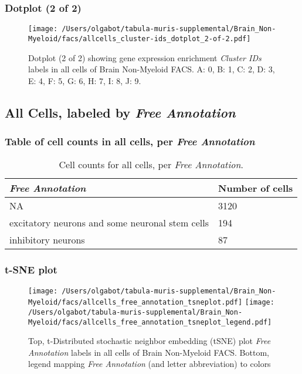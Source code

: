 \clearpage

\subsubsection{Dotplot (2 of 2)}
\begin{figure}[h]
\centering
\texttt{[image: /Users/olgabot/tabula-muris-supplemental/Brain\_Non-Myeloid/facs/allcells\_cluster-ids\_dotplot\_2-of-2.pdf]}

\caption{ Dotplot (2 of 2)  showing gene expression enrichment \emph{Cluster IDs} labels in all cells of Brain Non-Myeloid FACS. A: 0, B: 1, C: 2, D: 3, E: 4, F: 5, G: 6, H: 7, I: 8, J: 9.}
\end{figure}


\clearpage

\subsection{All Cells, labeled by \emph{Free Annotation}}
\subsubsection{Table of cell counts in all cells, per \emph{Free Annotation}}\begin{table}[h]
\centering
\label{my-label}
\begin{tabular}{@{}ll@{}}
\toprule

\emph{Free Annotation}& Number of cells \\ \midrule
NA & 3120 \\

excitatory neurons and some neuronal stem cells & 194 \\

inhibitory neurons & 87 \\
\bottomrule
\end{tabular}
\caption{Cell counts for all cells, per \emph{Free Annotation}.}
\end{table}

\clearpage
\subsubsection{t-SNE plot}
\begin{figure}[h]
\centering
\texttt{[image: /Users/olgabot/tabula-muris-supplemental/Brain\_Non-Myeloid/facs/allcells\_free\_annotation\_tsneplot.pdf]}
\texttt{[image: /Users/olgabot/tabula-muris-supplemental/Brain\_Non-Myeloid/facs/allcells\_free\_annotation\_tsneplot\_legend.pdf]}
\caption{Top, t-Distributed stochastic neighbor embedding (tSNE) plot  \emph{Free Annotation} labels in all cells of Brain Non-Myeloid FACS. Bottom, legend mapping \emph{Free Annotation} (and letter abbreviation) to colors}
\end{figure}


